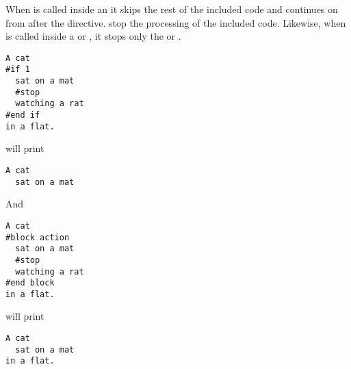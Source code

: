 When  is called inside an  it skips the rest of
the included code and continues on from after the  directive.
stop the processing of the included code.  Likewise, when  is
called inside a  or , it stops only the 
or .

\begin{verbatim}
A cat
#if 1
  sat on a mat
  #stop
  watching a rat
#end if
in a flat.
\end{verbatim}

will print 
\begin{verbatim}
A cat
  sat on a mat
\end{verbatim}

And
\begin{verbatim}
A cat
#block action
  sat on a mat
  #stop
  watching a rat
#end block
in a flat.
\end{verbatim}

will print

\begin{verbatim}
A cat
  sat on a mat
in a flat.
\end{verbatim}


